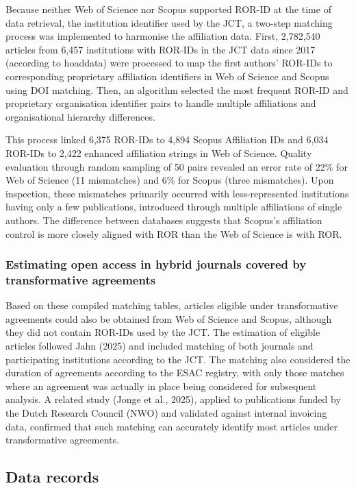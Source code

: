 \documentclass[a4paper,man,floatsintext,longtable,noextraspace,10pt]{apa6}
\begin{document}
Because neither Web of Science nor Scopus supported ROR-ID at the time
of data retrieval, the institution identifier used by the JCT, a
two-step matching process was implemented to harmonise the affiliation
data. First, 2,782,540 articles from 6,457 institutions with ROR-IDs in
the JCT data since 2017 (according to hoaddata) were processed to map
the first authors' ROR-IDs to corresponding proprietary affiliation
identifiers in Web of Science and Scopus using DOI matching. Then, an
algorithm selected the most frequent ROR-ID and proprietary organisation
identifier pairs to handle multiple affiliations and organisational
hierarchy differences.

This process linked 6,375 ROR-IDs to 4,894 Scopus Affiliation IDs and
6,034 ROR-IDs to 2,422 enhanced affiliation strings in Web of Science.
Quality evaluation through random sampling of 50 pairs revealed an error
rate of 22\% for Web of Science (11 mismatches) and 6\% for Scopus
(three mismatches). Upon inspection, these mismatches primarily occurred
with less-represented institutions having only a few publications,
introduced through multiple affiliations of single authors. The
difference between databases suggests that Scopus's affiliation control
is more closely aligned with ROR than the Web of Science is with ROR.

\subsubsection{Estimating open access in hybrid journals covered by
transformative
agreements}\label{estimating-open-access-in-hybrid-journals-covered-by-transformative-agreements}

Based on these compiled matching tables, articles eligible under
transformative agreements could also be obtained from Web of Science and
Scopus, although they did not contain ROR-IDs used by the JCT. The
estimation of eligible articles followed Jahn (2025) and included
matching of both journals and participating institutions according to
the JCT. The matching also considered the duration of agreements
according to the ESAC registry, with only those matches where an
agreement was actually in place being considered for subsequent
analysis. A related study (Jonge et al., 2025), applied to publications
funded by the Dutch Research Council (NWO) and validated against
internal invoicing data, confirmed that such matching can accurately
identify most articles under transformative agreements.

\subsection{Data records}\label{data-records}
\end{document}
